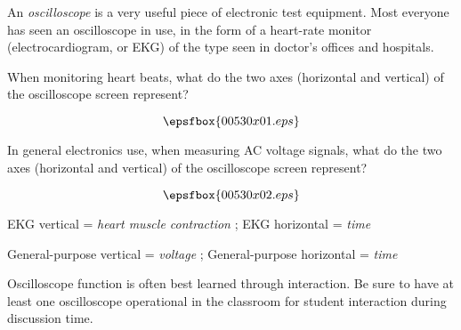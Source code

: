 

An {\it oscilloscope} is a very useful piece of electronic test equipment.  Most everyone has seen an oscilloscope in use, in the form of a heart-rate monitor (electrocardiogram, or EKG) of the type seen in doctor's offices and hospitals.

When monitoring heart beats, what do the two axes (horizontal and vertical) of the oscilloscope screen represent?

$$\epsfbox{00530x01.eps}$$

In general electronics use, when measuring AC voltage signals, what do the two axes (horizontal and vertical) of the oscilloscope screen represent?

$$\epsfbox{00530x02.eps}$$







EKG vertical = {\it heart muscle contraction} ; EKG horizontal = {\it time}

General-purpose vertical = {\it voltage} ; General-purpose horizontal = {\it time}







Oscilloscope function is often best learned through interaction.  Be sure to have at least one oscilloscope operational in the classroom for student interaction during discussion time.




